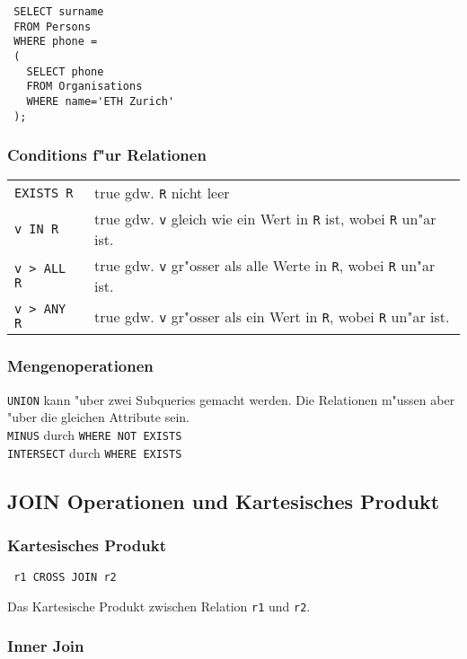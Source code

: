 \documentclass[german, 10pt, a4paper, twocolumn]{scrartcl}
\theoremstyle{definition}
\theoremstyle{remark}
\theoremstyle{example}
\begin{document}
\begin{verbatim}
 SELECT surname
 FROM Persons
 WHERE phone =
 (
   SELECT phone
   FROM Organisations
   WHERE name='ETH Zurich'
 );
\end{verbatim}


\subsubsection{Conditions f"ur Relationen}

\begin{tabular}{lp{5cm}}
	\verb#EXISTS R# &		true gdw. \verb#R# nicht leer\\
	\verb#v IN R# &			true gdw. \verb#v# gleich wie ein Wert in \verb#R# ist, wobei \verb#R# un"ar ist.\\
	\verb#v > ALL R# &		true gdw. \verb#v# gr"osser als alle Werte in \verb#R#, wobei \verb#R# un"ar ist.\\
	\verb#v > ANY R# &		true gdw. \verb#v# gr"osser als ein Wert in \verb#R#, wobei \verb#R# un"ar ist.
\end{tabular}


\subsubsection{Mengenoperationen}

\verb#UNION# kann "uber zwei Subqueries gemacht werden. Die Relationen m"ussen aber "uber die gleichen Attribute sein.\\

\verb#MINUS# durch \verb#WHERE NOT EXISTS#\\

\verb#INTERSECT# durch \verb#WHERE EXISTS#


\subsection{JOIN Operationen und Kartesisches Produkt}


\subsubsection{Kartesisches Produkt}

\begin{verbatim}
 r1 CROSS JOIN r2
\end{verbatim}

Das Kartesische Produkt zwischen Relation \verb#r1# und \verb#r2#.


\subsubsection{Inner Join}
\end{document}
